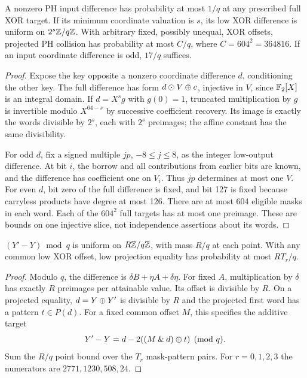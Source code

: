 \begin{lemma}[PH slices]\label{lem:phslice}
A nonzero PH input difference has probability at most $1/q$ at any prescribed full XOR target. If its minimum coordinate valuation is $s$, its low XOR difference is uniform on $2^s\mathbb Z/q\mathbb Z$. With arbitrary fixed, possibly unequal, XOR offsets, projected PH collision has probability at most $C/q$, where $C=604^2=364816$. If an input coordinate difference is odd, $17/q$ suffices.
\end{lemma}
\begin{proof}
Expose the key opposite a nonzero coordinate difference $d$, conditioning the other key. The full difference has form $d\odot V\mathbin\oplus c$, injective in $V$, since $\mathbb F_2[X]$ is an integral domain. If $d=X^s g$ with $g(0)=1$, truncated multiplication by $g$ is invertible modulo $X^{64-s}$ by successive coefficient recovery. Its image is exactly the words divisible by $2^s$, each with $2^s$ preimages; the affine constant has the same divisibility.

For odd $d$, fix a signed multiple $jp$, $-8\le j\le8$, as the integer low-output difference. At bit $i$, the borrow and all contributions from earlier bits are known, and the difference has coefficient one on $V_i$. Thus $jp$ determines at most one $V$. For even $d$, bit zero of the full difference is fixed, and bit 127 is fixed because carryless products have degree at most 126. There are at most 604 eligible masks in each word. Each of the $604^2$ full targets has at most one preimage. These are bounds on one injective slice, not independence assertions about its words.
\end{proof}

\begin{lemma}\label{lem:lowadd}
$(Y'-Y)\bmod q$ is uniform on $R\mathbb Z/q\mathbb Z$, with mass $R/q$ at each point. With any common low XOR offset, low projection equality has probability at most $RT_r/q$.
\end{lemma}
\begin{proof}
Modulo $q$, the difference is $\delta B+\eta A+\delta\eta$. For fixed $A$, multiplication by $\delta$ has exactly $R$ preimages per attainable value. Its offset is divisible by $R$. On a projected equality, $d=Y\mathbin\oplus Y'$ is divisible by $R$ and the projected first word has a pattern $t\in P(d)$. For a fixed common offset $M$, this specifies the additive target
\[
 Y'-Y=d-2((M\mathbin{\&} d)\mathbin\oplus t)\pmod q.
\]
Sum the $R/q$ point bound over the $T_r$ mask-pattern pairs. For $r=0,1,2,3$ the numerators are $2771,1230,508,24$.
\end{proof}


